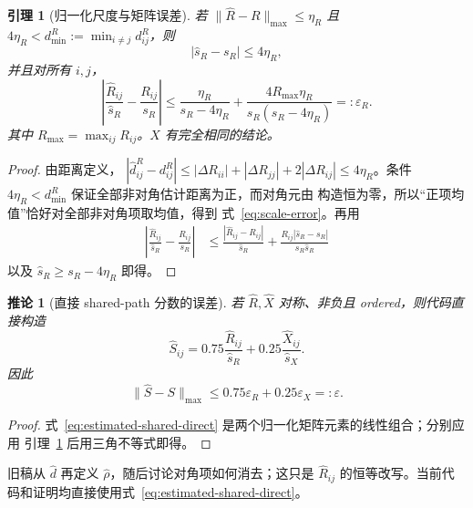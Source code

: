 \documentclass[UTF8,11pt]{ctexart}
\newtheorem{lemma}[definition]{引理}
\newtheorem{corollary}[definition]{推论}
\begin{document}
\begin{lemma}[归一化尺度与矩阵误差]
\label{lem:normalization}
若 $\|\widehat R-R\|_{\max}\le\eta_R$ 且
$4\eta_R<d^R_{\min}:=\min_{i\ne j}d^R_{ij}$，则
\begin{equation}
 |\widehat s_R-s_R|\le4\eta_R,
 \label{eq:scale-error}
\end{equation}
并且对所有 $i,j$，
\begin{equation}
 \left|\frac{\widehat R_{ij}}{\widehat s_R}-\frac{R_{ij}}{s_R}\right|
 \le
 \frac{\eta_R}{s_R-4\eta_R}
 +\frac{4R_{\max}\eta_R}{s_R(s_R-4\eta_R)}
 =:\varepsilon_R.
 \label{eq:normalized-R-error}
\end{equation}
其中 $R_{\max}=\max_{ij}R_{ij}$。$X$ 有完全相同的结论。
\end{lemma}

\begin{proof}
由距离定义，
$|\widehat d^R_{ij}-d^R_{ij}|\le|\Delta R_{ii}|+|\Delta R_{jj}|+2|\Delta R_{ij}|
\le4\eta_R$。条件 $4\eta_R<d^R_{\min}$ 保证全部非对角估计距离为正，而对角元由
构造恒为零，所以“正项均值”恰好对全部非对角项取均值，得到
式~\eqref{eq:scale-error}。再用
\begin{align*}
 \left|\frac{\widehat R_{ij}}{\widehat s_R}-\frac{R_{ij}}{s_R}\right|
 &\le\frac{|\widehat R_{ij}-R_{ij}|}{\widehat s_R}
 +\frac{R_{ij}|\widehat s_R-s_R|}{s_R\widehat s_R}
\end{align*}
以及 $\widehat s_R\ge s_R-4\eta_R$ 即得。
\end{proof}

\begin{corollary}[直接 shared-path 分数的误差]
\label{cor:shared-error}
若 $\widehat R,\widehat X$ 对称、非负且 ordered，则代码直接构造
\begin{equation}
 \widehat S_{ij}
 =0.75\frac{\widehat R_{ij}}{\widehat s_R}
 +0.25\frac{\widehat X_{ij}}{\widehat s_X}.
 \label{eq:estimated-shared-direct}
\end{equation}
因此
\begin{equation}
 \|\widehat S-S\|_{\max}
 \le0.75\varepsilon_R+0.25\varepsilon_X=: \varepsilon.
 \label{eq:shared-score-error}
\end{equation}
\end{corollary}

\begin{proof}
式~\eqref{eq:estimated-shared-direct} 是两个归一化矩阵元素的线性组合；分别应用
引理~\ref{lem:normalization} 后用三角不等式即得。
\end{proof}

旧稿从 $\widehat d$ 再定义 $\widehat\rho$，随后讨论对角项如何消去；这只是
$\widehat R_{ij}$ 的恒等改写。当前代码和证明均直接使用式~\eqref{eq:estimated-shared-direct}。
\end{document}
